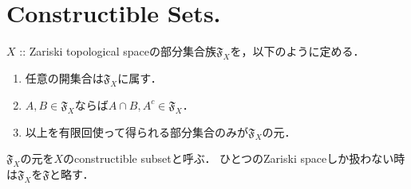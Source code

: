 \documentclass[a4paper]{jsarticle}
\begin{document}
\section{Constructible Sets.} %
    $X$ :: Zariski topological spaceの部分集合族$\mathfrak{F}_X$を，以下のように定める．
    \begin{enumerate}[label=(\arabic*),leftmargin=5\parindent]
        \item 任意の開集合は$\mathfrak{F}_X$に属す．
        \item $A,B \in \mathfrak{F}_X$ならば$A \cap B, A^c \in \mathfrak{F}_X$．
        \item 以上を有限回使って得られる部分集合のみが$\mathfrak{F}_X$の元．
    \end{enumerate}
    $\mathfrak{F}_X$の元を$X$のconstructible subsetと呼ぶ．
    ひとつのZariski spaceしか扱わない時は$\mathfrak{F}_X$を$\mathfrak{F}$と略す．
\end{document}
